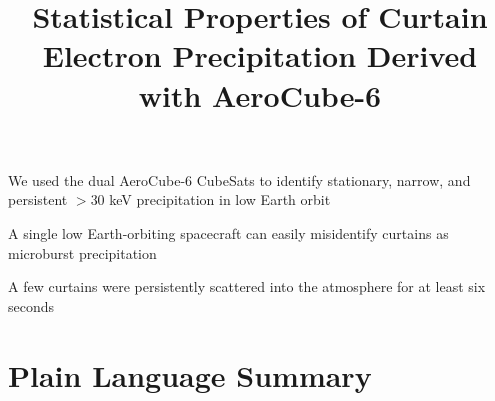 \documentclass[draft]{agujournal2019}
\begin{document}
\title{Statistical Properties of Curtain Electron Precipitation Derived with AeroCube-6}

%
%





\begin{keypoints}
\item We used the dual AeroCube-6 CubeSats to identify stationary, narrow, and persistent $>30$ keV precipitation in low Earth orbit
\item A single low Earth-orbiting spacecraft can easily misidentify curtains as microburst precipitation
\item A few curtains were persistently scattered into the atmosphere for at least six seconds
\end{keypoints}

%
%


\begin{abstract}
\end{abstract}

\section{Plain Language Summary}
\end{document}
